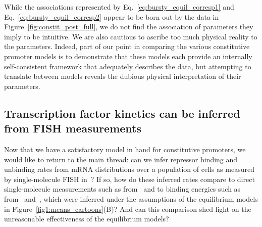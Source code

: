 While the associations represented by Eq.~\ref{eq:bursty_equil_corresp1} and
Eq.~\ref{eq:bursty_equil_corresp2} appear to be born out by the data in
Figure~\ref{fig:constit_post_full}, we do not find the association of parameters
they imply to be intuitive. We are also cautious to ascribe too much physical
reality to the parameters. Indeed, part of our point in comparing the various
constitutive promoter models is to demonstrate that these models each provide an
internally self-consistent framework that adequately describes the data, but
attempting to translate between models reveals the dubious physical
interpretation of their parameters.


\subsection{Transcription factor kinetics can be inferred from FISH
measurements}\label{sec:rep_kinetics_inference}

Now that we have a satisfactory model in hand for constitutive promoters, we
would like to return to the main thread: can we infer repressor binding and
unbinding rates from mRNA distributions over a population of cells as measured
by single-molecule FISH in~\cite{Jones2014}? If so, how do these inferred rates
compare to direct single-molecule measurements such as from~\cite{Hammar2014}
and to binding energies such as from~\cite{Garcia2011a}
and~\cite{Razo-Mejia2018}, which were inferred under the assumptions of the
equilibrium models in Figure~\ref{fig1:means_cartoons}(B)? And can this
comparison shed light on the unreasonable effectiveness of the equilibrium
models?

